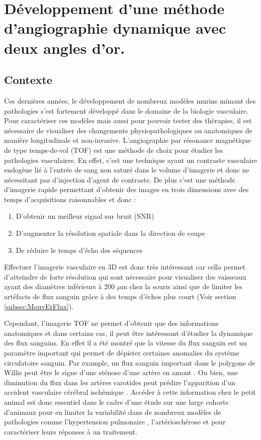\chapter{Développement d'une méthode d'angiographie dynamique avec deux angles d'or.}

\section{Contexte}

Ces dernières années, le développement de nombreux modèles murins mimant des pathologies s'est fortement développé dans le domaine de la biologie vasculaire. Pour caractériser ces modèles mais aussi pour pouvoir tester des thérapies, il est nécessaire de visualiser des changements physiopathologiques ou anatomiques de manière longitudinale et non-invasive. 
L'angiographie par résonance magnétique de type temps-de-vol (TOF) est une méthode de choix pour étudier les pathologies vasculaires. En effet, c'est une technique ayant un contraste vasculaire endogène lié à l'entrée de sang non saturé dans le volume d'imagerie et donc ne nécessitant pas d'injection d'agent de contraste. De plus c'est une méthode d'imagerie rapide permettant d'obtenir des images en trois dimensions avec des temps d'acquisitions raisonnables et donc :
\begin{enumerate}
\item D'obtenir un meilleur signal sur bruit (SNR)
\item D'augmenter la résolution spatiale dans la direction de coupe
\item De réduire le temps d'écho des séquences
\end{enumerate}
Effectuer l'imagerie vasculaire en 3D est donc très intéressant car cella permet d'atteindre de forte résolution qui sont nécessaire pour visualiser des vaisseaux ayant des diamètres inférieurs à 200 $\mu$m chez la souris ainsi que de limiter les artéfacts de flux sanguin grâce à des temps d'échos plus court (Voir section \ref{subsec:MouvEtFlux}).

Cependant, l'imagerie TOF ne permet d'obtenir que des informations anatomiques et dans certains cas, il peut être intéressant d'étudier la dynamique des flux sanguins. En effet il a été montré que la vitesse du flux sanguin est un paramètre important qui permet de dépister certaines anomalies du système circulatoire sanguin. Par example, un flux sanguin important dans le polygone de Willis peut être le signe d'une sténose d'une artère en amont \cite{Essig:1996ve}. Ou bien, une diminution du flux dans les artères carotides peut prédire l'apparition d'un accident vasculaire cérébral ischémique \cite{Bai2007Lower-blood-flo}. Accéder à cette information chez le petit animal est donc essentiel dans le cadre d'une étude sur une large cohorte d'animaux pour en limiter la variabilité dans de nombreux modèles de pathologies comme l'hypertension pulmonaire \cite{Cochet:2013dk}, l'artérioschérose \cite{La-Roque:2011rw} et pour caractériser leurs réponses à un traitement.

